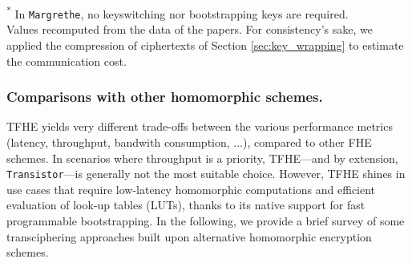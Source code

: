 \begin{table}[t!]
	\centering
	\caption{Performance of state-of-the-art TFHE-friendly ciphers (single-threaded when applicable). Communication cost accounts for both the encrypted symmetric key and the evaluation keys. \label{tab:comparisons_soa}}
	\begin{minipage}{\linewidth}
		\footnotesize\textsuperscript{*} In \texttt{Margrethe}, no keyswitching nor bootstrapping keys are required.\\
		\label{fn:margrethe_keysize}
		\footnotesize\textsuperscript{\dag} Values recomputed from the data of the papers. For consistency's sake, we applied the compression of ciphertexts of Section \ref{sec:key_wrapping} to estimate the communication cost.
		\label{fn:comm-cost}
	\end{minipage}
\end{table}


\subsubsection{Comparisons with other homomorphic schemes.} 
TFHE yields very different trade-offs between the various performance metrics (latency, throughput, bandwith consumption, ...), compared to other FHE schemes. In scenarios where throughput is a priority, TFHE—and by extension, \texttt{Transistor}—is generally not the most suitable choice. However, TFHE shines in use cases that require low-latency homomorphic computations and efficient evaluation of look-up tables (LUTs), thanks to its native support for fast programmable bootstrapping.
In the following, we provide a brief survey of some transciphering approaches built upon alternative homomorphic encryption schemes.

